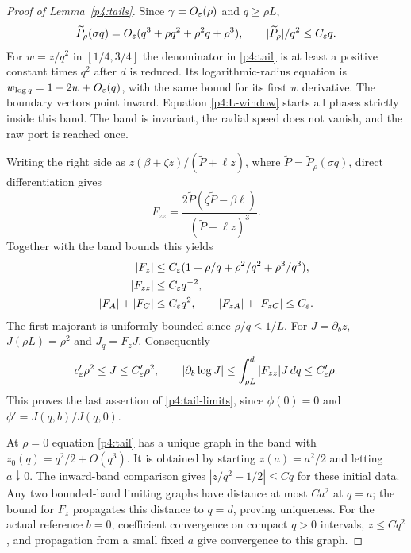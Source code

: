 \label{app:lower-tails-proof}

\begin{proof}[Proof of Lemma~\ref{p4:tails}]
Since $\gamma=O_\varepsilon(\rho)$ and $q\ge\rho L$,
\[
 \widetilde P_\rho(\sigma q)=O_\varepsilon(q^3+\rho q^2+\rho^2q+\rho^3),
 \qquad |\widetilde P_\rho|/q^2\le C_\varepsilon q.
\]
For $w=z/q^2$ in $[1/4,3/4]$ the denominator in
\eqref{p4:tail} is at least a positive constant times $q^2$
after $d$ is reduced. Its logarithmic-radius equation is
$w_{\log q}=1-2w+O_\varepsilon(q)$, with the same bound for its
first $w$ derivative. The boundary vectors point inward.
Equation \eqref{p4:L-window} starts all phases strictly inside
this band. The band is invariant, the radial speed does not vanish,
and the raw port is reached once.

Writing the right side as
$z(\beta+\zeta z)/(\widetilde P+\ell z)$, where
$\widetilde P=\widetilde P_\rho(\sigma q)$, direct differentiation gives
\[
 F_{zz}=\frac{2\widetilde P(\zeta\widetilde P-\beta\ell)}
                 {(\widetilde P+\ell z)^3}.
 \]
Together with the band bounds this yields
\begin{equation}\label{p4:tail-majorants}
\begin{split}
 |F_z|&\le C_\varepsilon(1+\rho/q+\rho^2/q^2+\rho^3/q^3),\\
 |F_{zz}|&\le C_\varepsilon q^{-2},\\
 |F_A|+|F_C|&\le C_\varepsilon q^2,\qquad
 |F_{zA}|+|F_{zC}|\le C_\varepsilon .
\end{split}
\end{equation}
The first majorant is uniformly bounded since $\rho/q\le1/L$.
For $J=\partial_bz$, $J(\rho L)=\rho^2$ and $J_q=F_zJ$.
Consequently
\begin{equation}\label{p4:J}
 c_\varepsilon'\rho^2\le J\le C_\varepsilon'\rho^2,\qquad
 |\partial_b\log J|
 \le\int_{\rho L}^d|F_{zz}|J\,d q\le C_\varepsilon'\rho.
\end{equation}
This proves the last assertion of \eqref{p4:tail-limits}, since
$\phi(0)=0$ and $\phi'=J(q,b)/J(q,0)$.

At $\rho=0$ equation
\eqref{p4:tail} has a unique graph in the band with
$z_0(q)=q^2/2+O(q^3)$.
It is obtained by starting $z(a)=a^2/2$ and letting $a\downarrow0$.
The inward-band comparison gives $|z/q^2-1/2|\le Cq$
for these initial data. Any two bounded-band limiting graphs have
distance at most $Ca^2$ at $q=a$; the bound for $F_z$
propagates this distance to $q=d$, proving uniqueness.
For the actual reference $b=0$, coefficient convergence on compact
$q>0$ intervals, $z\le Cq^2$, and propagation from a small fixed $a$
give convergence to this graph.


\end{proof}
